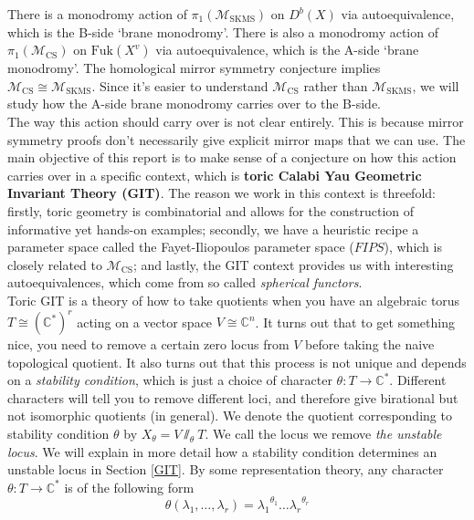 \documentclass[oneside]{amsart}
\theoremstyle{definition}
\theoremstyle{definition}
\theoremstyle{definition}
\theoremstyle{definition}
\newcommand{\CC}{\mathbb{C}}
\begin{document}
\newline
There is a monodromy action of $\pi_1(\mathcal{M}_{\text{SKMS}})$ on $D^b(X)$ via autoequivalence, which is the B-side `brane monodromy'. There is also a monodromy action of $\pi_1(\mathcal{M}_{\text{CS}})$ on $\text{Fuk}(X^v)$ via autoequivalence, which is the A-side `brane monodromy'. The homological mirror symmetry conjecture implies $\mathcal{M}_{\text{CS}} \cong \mathcal{M}_{\text{SKMS}}$. Since it's easier to understand $\mathcal{M}_{\text{CS}}$ rather than $\mathcal{M}_{\text{SKMS}}$, we will study how the A-side brane monodromy carries over to the B-side. \\
\newline
The way this action should carry over is not clear entirely. This is because mirror symmetry proofs don't necessarily give explicit mirror maps that we can use. The main objective of this report is to make sense of a conjecture on how this action carries over in a specific context, which is \textbf{toric Calabi Yau  Geometric Invariant Theory (GIT)}. The reason we work in this context is threefold: firstly, toric geometry is combinatorial and allows for the construction of informative yet hands-on examples; secondly, we have a heuristic recipe a parameter space called the Fayet-Iliopoulos parameter space ($FIPS$), which is closely related to $\mathcal{M}_{\text{CS}}$; and lastly, the GIT context provides us with interesting autoequivalences, which come from so called \textit{spherical functors}.\\
\newline
Toric GIT is a theory of how to take quotients when you have an algebraic torus $T \cong (\CC^*)^r$ acting on a vector space $V\cong \CC^n$. It turns out that to get something nice, you need to remove a certain zero locus from $V$ before taking the naive topological quotient. It also turns out that this process is not unique and depends on a \textit{stability condition}, which is just a choice of character $\theta: T \to \CC^*$. Different characters will tell you to remove different loci, and therefore give birational but not isomorphic quotients (in general). We denote the quotient corresponding to stability condition $\theta$ by $X_{\theta}=V \sslash_{\theta} T$. We call the locus we remove \textit{the unstable locus}. We will explain in more detail how a stability condition determines an unstable locus in Section \ref{GIT}. By some representation theory, any character $\theta: T \to \CC^*$ is of the following form
$$
\theta(\lambda_1, \dots, \lambda_r) = {\lambda_1}^{\theta_1} \dots {\lambda_r}^{\theta_r} 
$$
\end{document}
